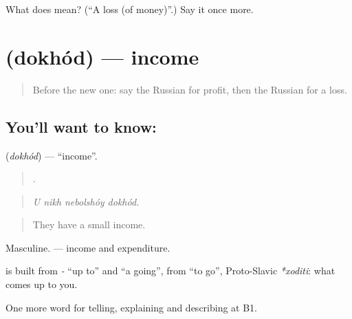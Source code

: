 \begin{tcolorbox}[breakable,colback=teal!4,colframe=teal!35!black,title={Before you move on}]
What does  mean? (\textquotedblleft{}A loss (of money)\textquotedblright{}.) Say it once more.
\end{tcolorbox}
\section[\texorpdfstring{\ru{доход} (dokhód)}{доход (dokhód)}]{ (dokhód) — income}

\label{lesson:RU-C361-dokhod}



\begin{quote}
Before the new one: say the Russian for profit, then the Russian for a loss.
\end{quote}

\subsection*{You'll want to know: }
\textbf{} (\emph{dokhód}) — \textquotedblleft{}income\textquotedblright{}.

\begin{quote}
   .
\end{quote}

\begin{quote}
\emph{U nikh nebolshóy dokhód.}
\end{quote}

\begin{quote}
They have a small income.
\end{quote}

Masculine. \emph{  } — income and expenditure.

\begin{cousinweb}
\textbf{} is built from \emph{-} \textquotedblleft{}up to\textquotedblright{} and \emph{} \textquotedblleft{}a going\textquotedblright{}, from \emph{} \textquotedblleft{}to go\textquotedblright{}, Proto-Slavic \emph{*xoditi}: what comes up to you.
\end{cousinweb}

\begin{grammarlens}[title={What you've built}]
One more word for telling, explaining and describing at B1.
\end{grammarlens}

